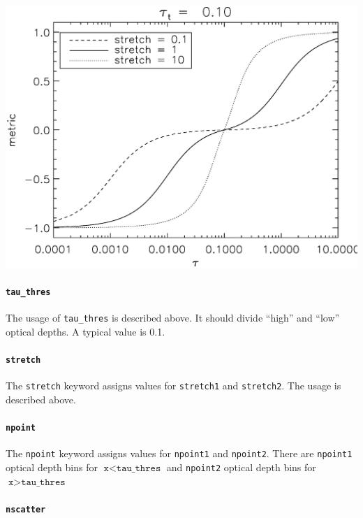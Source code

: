 \documentclass{article}
\begin{document}
\begin{center}
\includegraphics[width=\linewidth]{tau2metric_new.ps}
\end{center}

\paragraph{\texttt{tau\_thres}}

The usage of \texttt{tau\_thres} is described above.  It should divide
``high'' and ``low'' optical depths.  A typical value is 0.1.

\paragraph{\texttt{stretch}}

The \texttt{stretch} keyword assigns values for \texttt{stretch1} and
\texttt{stretch2}.  The usage is described above.

\paragraph{\texttt{npoint}}

The \texttt{npoint} keyword assigns values for \texttt{npoint1} and
\texttt{npoint2}.  There are \texttt{npoint1} optical depth bins for
$\texttt{x} < \texttt{tau\_thres}$ and \texttt{npoint2} optical depth
bins for $\texttt{x} > \texttt{tau\_thres}$

\paragraph{\texttt{nscatter}}
\end{document}
